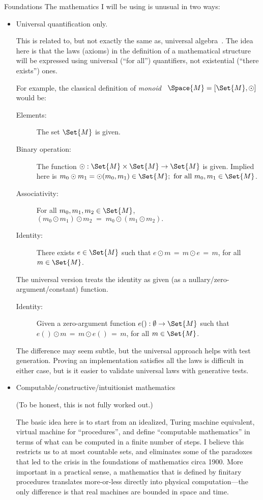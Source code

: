 \documentclass[12pt]{PalisadesLakesBook}
\begin{document}
\begin{plSection}{Foundations}
The mathematics I will be using is unusual in two ways:

\begin{itemize}
  
\item Universal quantification only.

This is related to, but not exactly the same as,
universal algebra~\cite{wiki:UniversalAlgebra}.
The idea here is that the laws (axioms) 
in the definition of a mathematical structure
will be expressed using
universal (``for all'') quantifiers, 
not existential (``there exists'') ones.

For example, the classical definition of 
\emph{monoid}~\cite{wiki:Monoid} $\Space{M} = [\Set{M}, \odot]$
would be:
\begin{description}
  \item[Elements:] The set $\Set{M}$ is given.
  \item[Binary operation:] The function
  $\odot : \Set{M} \times \Set{M} \rightarrow \Set{M}$ is given.
  Implied here is 
  $m_0 \odot m_1 = \odot(m_0,m_1) \in \Set{M};
  \text{ for all } m_0, m_1 \in \Set{M}$.
  \item[Associativity:] For all $m_0, m_1, m_2 \in \Set{M}$,
  $(m_0 \odot m_1) \odot m_2 \;=\; m_0 \odot (m_1 \odot m_2).$
  \item[Identity:] There exists $e \in \Set{M}$ such that
  $e \odot m \,=\, m \odot e \,=\, m$,
  for all $m \in \Set{M}$. 
\end{description}
The universal version treats the identity as given
(as a nullary/zero-argument/constant) function.
\begin{description}
  \item[Identity:] Given a zero-argument function 
  $e() : \emptyset \rightarrow \Set{M}$ such that
  $e() \odot m \,=\, m \odot e() \,=\, m$,
  for all $m \in \Set{M}$. 
\end{description}
The difference may seem subtle, but the universal approach
helps with test generation.
Proving an implementation satisfies all the laws is difficult 
in either case, but is it easier to validate
universal laws with generative tests.

\item Computable/constructive/intuitionist mathematics

(To be honest, this is not fully worked out.)

The basic idea here is to start from an
idealized, Turing machine equivalent,
virtual machine for ``procedures'', and define 
``computable mathematics'' in terms of what can be computed 
in a finite number of steps.
I believe this restricts us to at most countable sets,
and eliminates some of the paradoxes that led to the crisis
in the foundations of mathematics circa 1900.
More important in a practical sense, a mathematics that is
defined by finitary procedures translates more-or-less
directly into physical computation---the only difference is 
that real machines are bounded in space and time.


\end{itemize}
\end{plSection}
\end{document}

